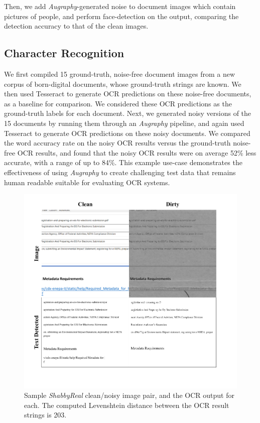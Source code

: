 \documentclass[runningheads]{llncs}
\begin{document}
Then, we add \emph{Augraphy}-generated noise to document images which contain pictures of people, and perform face-detection on the output, comparing the detection accuracy to that of the clean images.

\subsection{Character Recognition}
We first compiled 15 ground-truth, noise-free document images from a new corpus of born-digital documents, whose ground-truth strings are known. We then used Tesseract to generate OCR predictions on these noise-free documents, as a baseline for comparison. We considered these OCR predictions as the ground-truth labels for each document. Next, we generated noisy versions of the 15 documents by running them through an \emph{Augraphy} pipeline, and again used Tesseract to generate OCR predictions on these noisy documents. We compared the word accuracy rate on the noisy OCR results versus the ground-truth noise-free OCR results, and found that the noisy OCR results were on average 52\% less accurate, with a range of up to 84\%. This example use-case demonstrates the effectiveness of using \emph{Augraphy} to create challenging test data that remains human readable suitable for evaluating OCR systems.

\begin{figure}
\centering
\includegraphics[width=0.98\columnwidth, frame]{figures/ocr_figure.png}
\caption{Sample \emph{ShabbyReal} clean/noisy image pair, and the OCR output for each. The computed Levenshtein distance between the OCR result strings is 203.}
\label{fig:ocr_output}
\end{figure}
\end{document}

